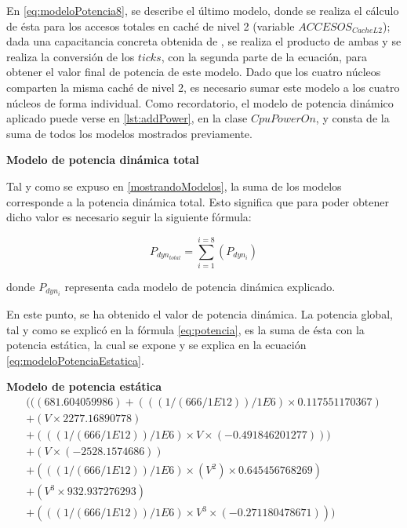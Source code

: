 En \ref{eq:modeloPotencia8}, se describe el último modelo, donde se realiza el cálculo de ésta para los accesos totales en caché de nivel 2 (variable $ACCESOS_{CacheL2}$); dada una capacitancia concreta obtenida de \cite{soton393728} \cite{soton418538}, se realiza el producto de ambas y se realiza la conversión de los $ticks$, con la segunda parte de la ecuación, para obtener el valor final de potencia de este modelo. Dado que los cuatro núcleos comparten la misma caché de nivel 2, es necesario sumar este modelo a los cuatro núcleos de forma individual. Como recordatorio, el modelo de potencia dinámico aplicado puede verse en \ref{lst:addPower}, en la clase $CpuPowerOn$, y consta de la suma de todos los modelos mostrados previamente. \\

\par{\textbf{Modelo de potencia dinámica total} \\}{
Tal y como se expuso en \ref{mostrandoModelos}, la suma de los modelos corresponde a la potencia dinámica total. Esto significa que para poder obtener dicho valor es necesario seguir la siguiente fórmula:

\begin{equation}
P_{dyn_{total}} = \sum_{i=1}^{i=8}\left ( P_{dyn_{i}} \right )
\label{eq:modeloPotenciaDinamica}
\end{equation}

donde $P_{dyn_{i}}$ representa cada modelo de potencia dinámica explicado.

En este punto, se ha obtenido el valor de potencia dinámica. La potencia global, tal y como se explicó en la fórmula \ref{eq:potencia}, es la suma de ésta con la potencia estática, la cual se expone y se explica en la ecuación \ref{eq:modeloPotenciaEstatica}.}


\par{\textbf{Modelo de potencia estática}}{
\begin{equation}
\begin{split}
(((681.604059986) + (((1 / (666 / 1E12))/1E6) \times 0.117551170367) \\
  + (V \times 2277.16890778) \\
  + (((1 / (666 / 1E12)) / 1E6) \times V \times (-0.491846201277))) \\ 
  + (V \times (-2528.1574686)) \\
  + (((1 / (666 / 1E12)) / 1E6) \times (V^2) \times 0.645456768269) \\ 
  + (V^3 \times 932.937276293) \\
  + (((1 / (666 / 1E12)) / 1E6) \times V^3 \times (-0.271180478671)))
\end{split}
\label{eq:modeloPotenciaEstatica}
\end{equation}
}

